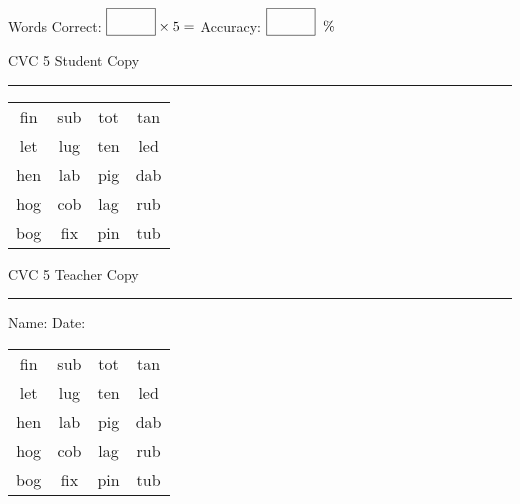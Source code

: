 \documentclass{memoir}
\begin{document}
\normalsize

Words Correct: $\fbox{\phantom{\huge 100}} \times 5 = $ Accuracy: $\fbox{\phantom{\huge 100}}\;\; \%$ 

\vfill

\newpage


\footnotesize \noindent
CVC 5 \hfill Student Copy
\smallskip
\hrule

\huge

\setlength{\tabcolsep}{14pt}
\def\arraystretch{2}

{\selectfont


\begin{vplace}[0.5]
\begin{center}
\begin{tabular}{cccc}
fin & sub & tot & tan \\
let & lug & ten & led \\
hen & lab & pig & dab \\
hog & cob & lag & rub \\
bog & fix & pin & tub \\
\end{tabular}
\end{center}
\end{vplace}

}

\newpage

\footnotesize \noindent
CVC 5 \hfill Teacher Copy
\smallskip
\hrule

\normalsize

\vfill

\noindent
Name: \underline{\hspace{1.75in}} \hfill Date: \underline{\hspace{1in}}

\huge

{\selectfont


\begin{vplace}[0.5]
\begin{center}
\begin{tabular}{cccc}
fin & sub & tot & tan \\
let & lug & ten & led \\
hen & lab & pig & dab \\
hog & cob & lag & rub \\
bog & fix & pin & tub \\
\end{tabular}
\end{center}
\end{vplace}



}
\end{document}
